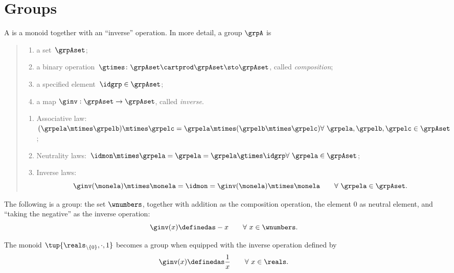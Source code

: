 

\section{Groups}
\label{sec:groups}
\begin{ctdefinition}[Group]
  \label{def:group}
  A \emph{} is a monoid together with an ``inverse'' operation.
  In more detail, a group $\grpA$ is
  \begin{quote}
    \constit
    \begin{enumerate}
      \item a set~$\grpAset$;
      \item a binary operation~$\gtimes \colon \grpAset \cartprod \grpAset \sto \grpAset$, called \emph{composition};
      \item a specified element~$\idgrp \in \grpAset$;
      \item a map $\ginv: \grpAset \to \grpAset$, called \emph{inverse}.
    \end{enumerate}
    \condit
    \begin{enumerate}
      \item Associative law:~$(\grpela\mtimes \grpelb)\mtimes \grpelc=\grpela\mtimes (\grpelb\mtimes \grpelc) \hfill \forall \  \grpela, \grpelb, \grpelc \in \grpAset$;
      \item Neutrality laws:~$\idmon\mtimes \grpela=\grpela=\grpela \gtimes \idgrp \hfill \forall \  \grpela \in \grpAset$;
      \item Inverse laws:
      \begin{equation}
        \label{eq:group-inverse-law}
        \ginv(\monela) \mtimes \monela = \idmon = \ginv(\monela) \mtimes \monela \quad \quad \forall \  \grpela  \in \grpAset.
      \end{equation}
    \end{enumerate}
  \end{quote}
\end{ctdefinition}
\begin{example}
  The following is a group: the set $\wnumbers$, together with addition as the composition operation, the element $0$ as neutral element, and ``taking the negative'' as the inverse operation:
  \begin{equation}
    \ginv(x) \definedas -x \quad \quad \forall \ x \in \wnumbers.
  \end{equation}
\end{example}
\begin{example}
  The monoid $\tup{\reals_{\backslash \{ 0 \}}, \cdot, 1}$ becomes a group when equipped with the inverse operation defined by
  \begin{equation}
    \ginv(x) \definedas \frac{1}{x} \quad \quad \forall \ x \in \reals.
  \end{equation}
\end{example}
